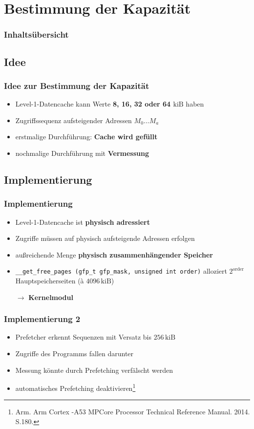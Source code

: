 \documentclass{beamer}
\begin{document}
\section{Bestimmung der Kapazität}
\begin{frame}
	\frametitle{Inhaltsübersicht}
	\tableofcontents[currentsection]
\end{frame}

\subsection{Idee}
\begin{frame}
\frametitle{Idee zur Bestimmung der Kapazität}
\begin{itemize}
	\item Level-1-Datencache kann Werte \textbf{8, 16, 32 oder 64 $\textrm{kiB}$} haben
	\item Zugriffssequenz aufsteigender Adressen $M_0 \dots M_a$
	\item erstmalige Durchführung: \textbf{Cache wird gefüllt}
	\item nochmalige Durchführung mit \textbf{Vermessung}
\end{itemize}
\end{frame}

\subsection{Implementierung}
\begin{frame}
\frametitle{Implementierung}
\begin{itemize}
	\item Level-1-Datencache ist \textbf{physisch adressiert}
	\item Zugriffe müssen auf physisch aufsteigende Adressen erfolgen
	\item außreichende Menge \textbf{physisch zusammenhängender Speicher}
	\item \texttt{\_\_get\_free\_pages (gfp\_t gfp\_mask, unsigned int order)} alloziert $2^{\textrm{order}}$ Hauptspeicherseiten (à $4096 \,\textrm{kiB}$)
	\item [\textbf{$\rightarrow$}] \textbf{Kernelmodul}
\end{itemize}
\end{frame}

\begin{frame}
\frametitle{Implementierung 2}
\begin{itemize}
	\item Prefetcher erkennt Sequenzen mit Versatz bis $256 \,\textrm{kiB}$
	\item Zugriffe des Programms fallen darunter
	\item Messung könnte durch Prefetching verfälscht werden
	\item automatisches Prefetching deaktivieren\footnote{\tiny Arm. Arm Cortex -A53 MPCore Processor Technical Reference Manual. 2014. S.180.}
\end{itemize}
\end{frame}
\end{document}
